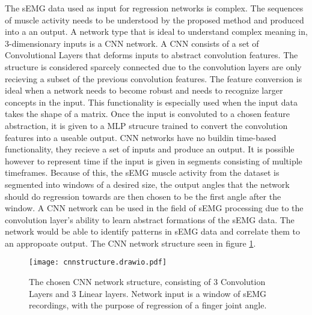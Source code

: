 \documentclass[../main.tex]{subfiles}
\begin{document}
The sEMG data used as input for regression networks is complex.
The sequences of muscle activity needs to be understood by the proposed method and produced into a an output.
A network type that is ideal to understand complex meaning in, 3-dimensionary inputs is a CNN network.
A CNN consists of a set of Convolutional Layers that deforms inputs to abstract convolution features.
The structure is considered sparcely connected due to the convolution layers are only recieving a subset of the previous convolution features.
The feature conversion is ideal when a network needs to become robust and needs to recognize larger concepts in the input.
This functionality is especially used when the input data takes the shape of a matrix.
Once the input is convoluted to a chosen feature abstraction, it is given to a MLP strucure trained to convert the convolution features into a useable output.
CNN networks have no buildin time-based functionality, they recieve a set of inputs and produce an output.
It is possible however to represent time if the input is given in segments consisting of multiple timeframes.
Because of this, the sEMG muscle activity from the dataset is segmented into windows of a desired size, the output angles that the network should do regression towards are then chosen to be the first angle after the window.
A CNN network can be used in the field of sEMG processing due to the convolution layer's ability to learn abstract formations of the sEMG data.
The network would be able to identify patterns in sEMG data and correlate them to an appropoate output.
The CNN network structure seen in figure \ref{fig:cnn_structure}.

\begin{figure}[H]
\begin{center}
\texttt{[image: cnnstructure.drawio.pdf]}
\caption{The chosen CNN network structure, consisting of 3 Convolution Layers and 3 Linear layers. Network input is a window of sEMG recordings, with the purpose of regression of a finger joint angle.}
\label{fig:cnn_structure}
\end{center}
\end{figure}
\end{document}

